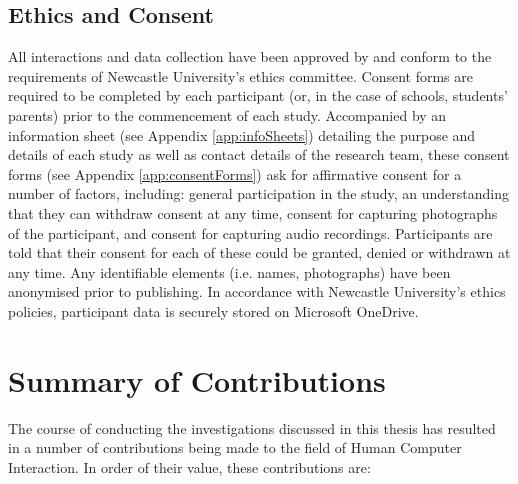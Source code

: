 \subsection{Ethics and Consent}
All interactions and data collection have been approved by and conform to the requirements of Newcastle University’s ethics committee. Consent forms are required to be completed by each participant (or, in the case of schools, students' parents) prior to the commencement of each study. Accompanied by an information sheet (see Appendix \ref{app:infoSheets}) detailing the purpose and details of each study as well as contact details of the research team, these consent forms (see Appendix \ref{app:consentForms}) ask for affirmative consent for a number of factors, including: general participation in the study, an understanding that they can withdraw consent at any time, consent for capturing photographs of the participant, and consent for capturing audio recordings. Participants are told that their consent for each of these could be granted, denied or withdrawn at any time. Any identifiable elements (i.e. names, photographs) have been anonymised prior to publishing. In accordance with Newcastle University's ethics policies, participant data is securely stored on Microsoft OneDrive.

\section{Summary of Contributions}
The course of conducting the investigations discussed in this thesis has resulted in a number of contributions being made to the field of Human Computer Interaction. In order of their value, these contributions are:


